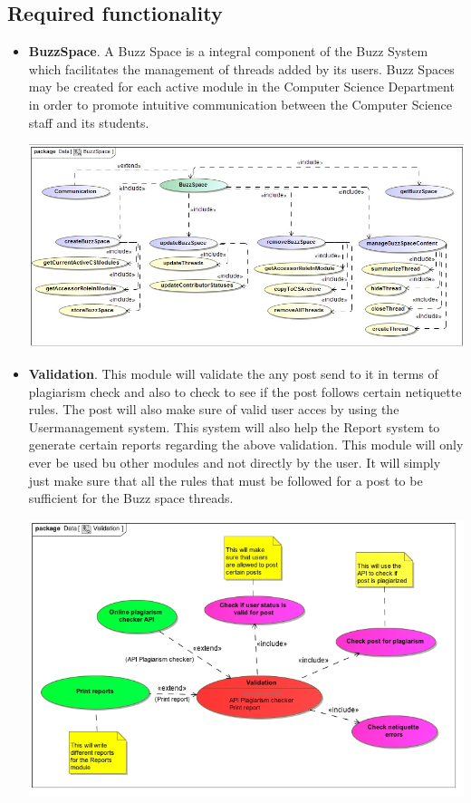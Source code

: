 \documentclass[a4paper,12pt]{report}
\begin{document}
\subsection{Required functionality}
\begin{itemize}
\newpage
	\item \textbf{BuzzSpace}. A Buzz Space is a integral component of the Buzz System which facilitates the management of threads added by its users. Buzz Spaces may be created for each active module in the Computer Science Department in order to promote intuitive communication between the Computer Science staff and its students.	
		\begin{center}
  	 	\includegraphics[width=1\textwidth] {../Lelethu/UseCase_BuzzSpace.jpg}\\[0.4cm]    
		\end{center}
\newpage
\item \textbf{Validation}.  This module will validate the any post send to it in terms of plagiarism check and also to check to see if the post follows certain netiquette rules. The post will also make sure of valid user acces by using the Usermanagement system. This system will also help the Report system to generate certain reports regarding the above validation. This module will only ever be used  bu other modules and not directly by the user. It will simply just make sure that all the rules that must be followed for a post to be sufficient for the Buzz space threads.
		\begin{center}
  	 	\includegraphics[width=1\textwidth] {../Chris/Validation.jpg}\\[0.4cm]    

\end{center}
\end{itemize}
\end{document}
